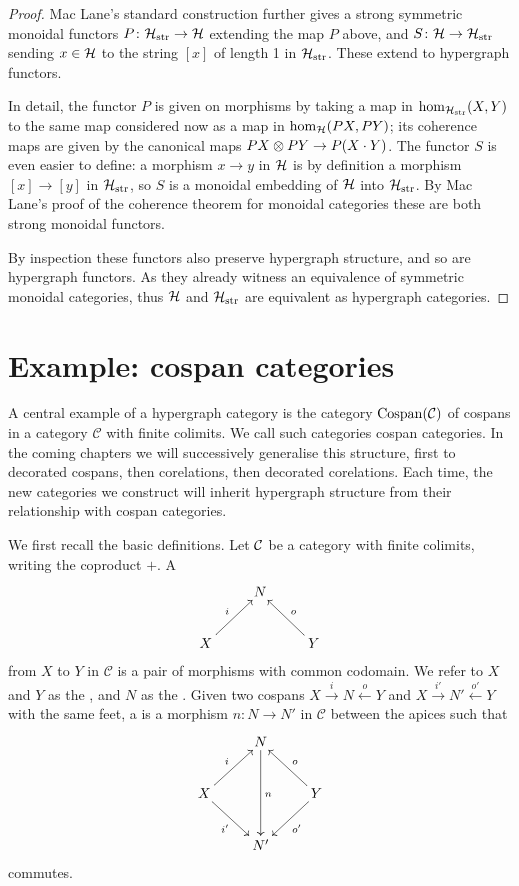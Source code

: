 \begin{proof}
  Mac Lane's standard construction further gives a strong symmetric monoidal
  functors $P{\colon} \mathcal H_{\mathrm{str}} \to \mathcal H$ extending the map $P$ above,
  and $S{\colon} \mathcal H \to \mathcal H_{\mathrm{str}}$ sending $x \in \mathcal H$ to the
  string $[x]$ of length 1 in $\mathcal H_{\mathrm{str}}$. These extend to hypergraph
  functors.

  In detail, the functor $P$ is given on morphisms by taking a map in
  $\mathrm{hom}_{\mathcal H_{\mathrm{str}}}(X,Y)$ to the same map considered now as a
  map in $\mathrm{hom}_{\mathcal H}(PX,PY)$; its coherence maps are given by the
  canonical maps $PX \otimes PY \to P(X\cdot Y)$. The functor $S$ is even easier to
  define: a morphism $x \to y$ in $\mathcal H$ is by definition a morphism $[x] \to
  [y]$ in $\mathcal H_{\mathrm{str}}$, so $S$ is a monoidal embedding of $\mathcal H$ into
  $\mathcal H_{\mathrm{str}}$. By Mac Lane's proof of the coherence theorem for monoidal categories these are
  both strong monoidal functors. 
  
  By inspection these functors also preserve hypergraph
  structure, and so are hypergraph functors.  As they already witness an
  equivalence of symmetric monoidal categories, thus $\mathcal H$ and $\mathcal
  H_{\mathrm{str}}$ are equivalent as hypergraph categories.
\end{proof}

\section{Example: cospan categories}

A central example of a hypergraph category is the category $\operatorname{{Cospan}}(\mathcal C)$
of cospans in a category $\mathcal C$ with finite colimits. We call such
categories cospan categories. In the coming chapters we will successively
generalise this structure, first to decorated cospans, then corelations, then
decorated corelations. Each time, the new categories we construct will inherit
hypergraph structure from their relationship with cospan categories.

We first recall the basic definitions. Let $\mathcal C$ be a category with finite
colimits, writing the coproduct $+$. A 
\[
  \xymatrix{
    & N \\
    X \ar[ur]^{i} && Y \ar[ul]_{o}
  }
\]
from $X$ to $Y$ in $\mathcal C$ is a pair of morphisms with common codomain. We
refer to $X$ and $Y$ as the , and $N$ as the .  Given
two cospans $X \stackrel{i}{\longrightarrow} N \stackrel{o}{\longleftarrow} Y$
and $X \stackrel{i'}{\longrightarrow} N' \stackrel{o'}{\longleftarrow} Y$ with
the same feet, a  is a morphism $n\colon  N \to N'$ in
$\mathcal C$ between the apices such that
\[
  \xymatrix{
    & N \ar[dd]^n  \\
    X \ar[ur]^{i} \ar[dr]_{i'} && Y \ar[ul]_{o} \ar[dl]^{o'}\\
    & N'
  }
\]
commutes.

